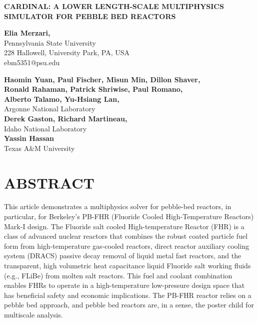 \documentclass[11pt,letterpaper,english]{article}
\begin{document}
\vspace*{-0.45in}
\begin{center}
{\Large\centering\bf CARDINAL: A LOWER LENGTH-SCALE MULTIPHYSICS SIMULATOR FOR PEBBLE BED REACTORS}

\vspace{3pt}

{\bf \large Elia Merzari,} \\
\large Pennsylvania State University \\
\large 228 Hallowell, University Park, PA, USA \\
{\color{brown} ebm5351@psu.edu} \\

\vspace{0.25in}

{\bf \large Haomin Yuan, Paul Fischer, Misun Min, Dillon Shaver,} \\
{\bf \large Ronald Rahaman, Patrick Shriwise, Paul Romano, } \\
{\bf \large Alberto Talamo, Yu-Hsiang Lan, } \\
\large Argonne National Laboratory \\
\vspace{0.45in}
{\bf \large Derek Gaston, Richard Martineau,} \\
\large Idaho National Laboratory \\
\vspace{0.45in}
{\bf \large  Yassin Hassan } \\
\large Texas A\&M University \\


\end{center}



\normalsize

\section*{ABSTRACT}

This article demonstrates a multiphysics solver for pebble-bed reactors, in particular, for Berkeley's PB-FHR (Fluoride Cooled High-Temperature Reactors) Mark-I design. The Fluoride salt cooled High-temperature Reactor (FHR) is a class of advanced nuclear reactors that combines the robust coated particle fuel form from high-temperature gas-cooled reactors, direct reactor auxiliary cooling system (DRACS) passive decay removal of liquid metal fast reactors, and the transparent, high volumetric heat capacitance liquid Fluoride salt working fluids (e.g., FLiBe) from molten salt reactors. This fuel and coolant combination enables FHRs to operate in a high-temperature low-pressure design space that has beneficial safety and economic implications. The PB-FHR reactor relies on a pebble bed approach, and pebble bed reactors are, in a sense, the poster child for multiscale analysis.
\end{document}
